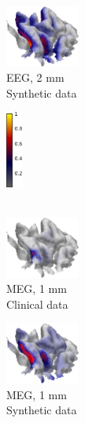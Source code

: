 \documentclass[5p]{elsarticle}
\begin{document}
\begin{figure}[h!]
\begin{footnotesize}
\begin{center}
\begin{minipage}{3cm}
\begin{center}
\end{center}\end{minipage}
\begin{minipage}{3cm} \begin{center}
\includegraphics[height=2.0cm]{MAP_EEG_IG_2mm_syntheticdata.png} \\ EEG, 2 mm \\ Synthetic data
\end{center}\end{minipage}
\begin{minipage}{0.5cm} \begin{center}
\includegraphics[height=2.5cm]{colorbar.png} \\ \mbox{} \\ \mbox{}
\end{center}
\end{minipage} \vskip0.2cm
\begin{minipage}{3cm} \begin{center}
\includegraphics[height=2.0cm]{MAP_MEG_IG_1mm.png} \\ MEG, 1 mm \\ Clinical data
\end{center}\end{minipage}
\begin{minipage}{3cm} \begin{center}
\includegraphics[height=2.0cm]{MAP_MEG_IG_1mm_syntheticdata.png} \\ MEG, 1 mm \\ Synthetic data

\end{center}
\end{minipage}
\end{center}
\end{footnotesize}
\end{figure}
\end{document}
